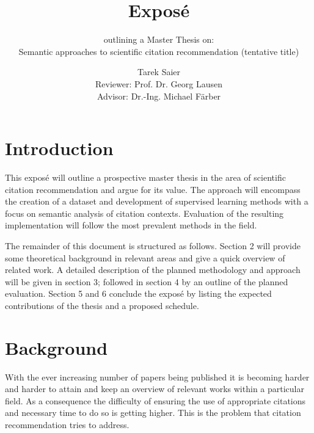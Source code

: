 \documentclass{proseminar}
\begin{document}

\title{Expos\'e}
\subtitle{outlining a Master Thesis on:\\Semantic approaches to scientific citation recommendation (tentative title)}

\author{Tarek Saier\\Reviewer: Prof. Dr. Georg Lausen\\Advisor: Dr.-Ing. Michael Färber}

\maketitle

\section{Introduction}
This expos\'e will outline a prospective master thesis in the area of scientific citation recommendation and argue for its value. The approach will encompass the creation of a dataset and development of supervised learning methods with a focus on semantic analysis of citation contexts. Evaluation of the resulting implementation will follow the most prevalent methods in the field.

The remainder of this document is structured as follows. Section 2 will provide some theoretical background in relevant areas and give a quick overview of related work. A detailed description of the planned methodology and approach will be given in section 3; followed in section 4 by an outline of the planned evaluation. Section 5 and 6 conclude the expos\'e by listing the expected contributions of the thesis and a proposed schedule.

\section{Background}
With the ever increasing number of papers being published it is becoming harder and harder to attain and keep an overview of relevant works within a particular field. As a consequence the difficulty of ensuring the use of appropriate citations and necessary time to do so is getting higher. This is the problem that citation recommendation tries to address.
\end{document}
